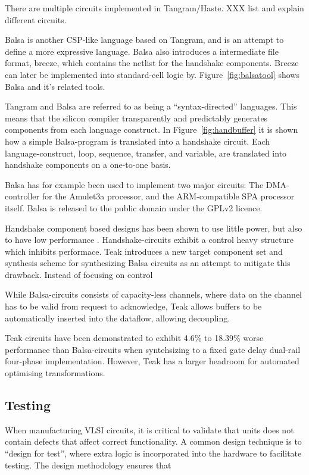 There are multiple circuits implemented in Tangram/Haste. XXX list and
explain different circuits.

Balsa is another CSP-like language based on Tangram, and is an attempt
to define a more expressive language. Balsa also introduces a
intermediate file format, breeze, which contains the netlist for the
handshake components. Breeze can later be implemented into
standard-cell logic by. Figure~\ref{fig:balsatool} shows Balsa and
it's related tools.

Tangram and Balsa are referred to as being a ``syntax-directed''
languages. This means that the silicon compiler transparently and
predictably generates components from each language construct. In
Figure~\ref{fig:handbuffer} it is shown how a simple Balsa-program is
translated into a handshake circuit. Each language-construct, loop,
sequence, transfer, and variable, are translated into handshake
components on a one-to-one basis.

Balsa has for example been used to implement two major circuits: The
DMA-controller for the Amulet3a processor, and the ARM-compatible SPA
processor itself. Balsa is released to the public domain under the
GPLv2 licence.

Handshake component based designs has been shown to use little power,
but also to have low performance \cite{80c51}. Handshake-circuits
exhibit a control heavy structure which inhibits performace. Teak
\cite{teak} introduces a new target component set and synthesis scheme
for synthesizing Balsa circuits as an attempt to mitigate this
drawback. Instead of focusing on control

While Balsa-circuits consists of capacity-less channels, where data on
the channel has to be valid from request to acknowledge, Teak allows
buffers to be automatically inserted into the dataflow, allowing
decoupling. 

Teak circuits have been demonstrated to exhibit 4.6\% to 18.39\% worse
performance than Balsa-circuits when syntehsizing to a fixed gate
delay dual-rail four-phase implementation. However, Teak has a larger
headroom for automated optimising transformations.

\subsection{Testing}

When manufacturing VLSI circuits, it is critical to validate that
units does not contain defects that affect correct functionality. A
common design technique is to ``design for test'', where extra logic
is incorporated into the hardware to facilitate testing. The design
methodology ensures that 

